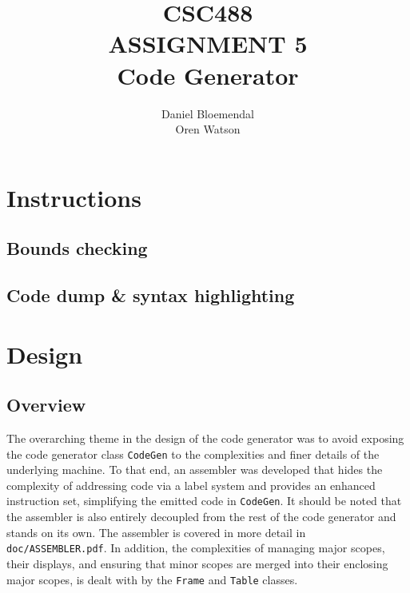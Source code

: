 \documentclass[oneside]{amsart}
\theoremstyle{definition}
\theoremstyle{remark}
\numberwithin{equation}{section}
\begin{document}
\title[CSC488 A5]{CSC488\\ASSIGNMENT 5\\Code Generator}
\author{Daniel Bloemendal \\ Oren Watson}

\begin{titlepage}
\maketitle
\thispagestyle{empty}
\tableofcontents
\end{titlepage}

\section{Instructions}
\subsection{Bounds checking}
\subsection{Code dump \& syntax highlighting}

\section{Design}
\subsection{Overview}
The overarching theme in the design of the code generator was to avoid exposing the code generator
class \texttt{CodeGen} to the complexities and finer details of the underlying machine. To that
end, an assembler was developed that hides the complexity of addressing code via a label system and
provides an enhanced instruction set, simplifying the emitted code in \texttt{CodeGen}. It should be
noted that the assembler is also entirely decoupled from the rest of the code generator and stands
on its own. The assembler is covered in more detail in \texttt{doc/ASSEMBLER.pdf}. In addition, the
complexities of managing major scopes, their displays, and ensuring that minor scopes are merged
into their enclosing major scopes, is dealt with by the \texttt{Frame} and \texttt{Table} classes.
\end{document}
